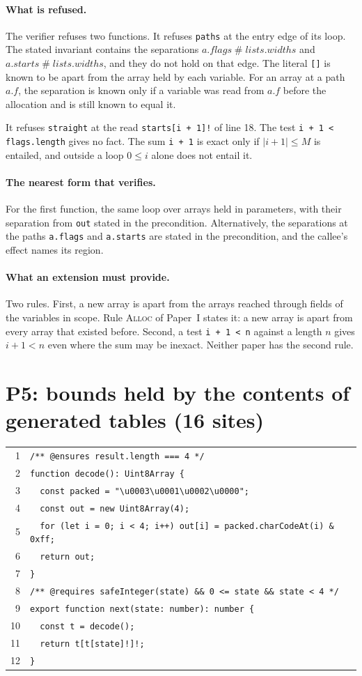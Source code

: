 \documentclass[10pt,a4paper]{article}
\theoremstyle{definition}
\theoremstyle{remark}
\newcommand{\sep}{\mathrel{\#}}
\newcommand{\code}[1]{\texttt{#1}}
\newcommand{\entry}[1]{\paragraph{#1.}}
\begin{document}
\entry{What is refused} The verifier refuses two functions. It refuses
\code{paths} at the entry edge of its loop. The stated invariant
contains the separations
$a.\mathit{flags}\sep\mathit{lists}.\mathit{widths}$ and
$a.\mathit{starts}\sep\mathit{lists}.\mathit{widths}$, and they do not
hold on that edge. The literal \code{[]} is known to be apart from the
array held by each variable. For an array at a path $a.f$, the
separation is known only if a variable was read from $a.f$ before the
allocation and is still known to equal it.

It refuses \code{straight} at the read \code{starts[i + 1]!} of line
18. The test \code{i + 1 < flags.length} gives no fact. The sum
\code{i + 1} is exact only if $|i+1|\le M$ is entailed, and outside a
loop $0\le i$ alone does not entail it.

\entry{The nearest form that verifies} For the first function, the same loop over arrays held
in parameters, with their separation from \code{out} stated in the
precondition. Alternatively, the separations at the paths
\code{a.flags} and \code{a.starts} are stated in the precondition, and
the callee's effect names its region.

\entry{What an extension must provide} Two rules. First, a new array is apart from the arrays
reached through fields of the variables in scope. Rule \textsc{Alloc} of Paper~I
states it: a new array is apart from every array that existed before.
Second, a test
\code{i + 1 < n} against a length $n$ gives $i+1<n$ even where the sum
may be inexact. Neither paper has the second rule.

\section{P5: bounds held by the contents of generated tables (16 sites)}

{\footnotesize
\begin{tabular}{@{}r@{\hspace{1em}}l@{}}
1 & \code{/** @ensures result.length === 4 */} \\
2 & \code{function decode(): Uint8Array \{} \\
3 & \code{~~const packed = "\textbackslash u0003\textbackslash u0001\textbackslash u0002\textbackslash u0000";} \\
4 & \code{~~const out = new Uint8Array(4);} \\
5 & \code{~~for (let i = 0; i < 4; i++) out[i] = packed.charCodeAt(i) \& 0xff;} \\
6 & \code{~~return out;} \\
7 & \code{\}} \\
8 & \code{/** @requires safeInteger(state) \&\& 0 <= state \&\& state < 4 */} \\
9 & \code{export function next(state: number): number \{} \\
10 & \code{~~const t = decode();} \\
11 & \code{~~return t[t[state]!]!;} \\
12 & \code{\}} \\
\end{tabular}}
\end{document}

